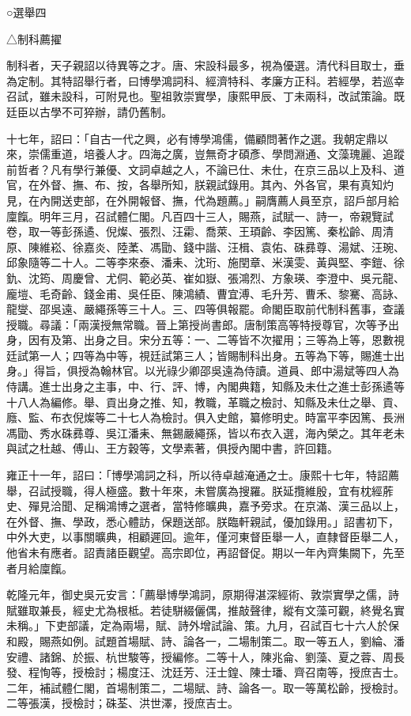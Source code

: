 
\begin{pinyinscope}
○選舉四

△制科薦擢

制科者，天子親詔以待異等之才。唐、宋設科最多，視為優選。清代科目取士，垂為定制。其特詔舉行者，曰博學鴻詞科、經濟特科、孝廉方正科。若經學，若巡幸召試，雖未設科，可附見也。聖祖敦崇實學，康熙甲辰、丁未兩科，改試策論。既廷臣以古學不可猝辦，請仍舊制。

十七年，詔曰：「自古一代之興，必有博學鴻儒，備顧問著作之選。我朝定鼎以來，崇儒重道，培養人才。四海之廣，豈無奇才碩彥、學問淵通、文藻瑰麗、追蹤前哲者？凡有學行兼優、文詞卓越之人，不論已仕、未仕，在京三品以上及科、道官，在外督、撫、布、按，各舉所知，朕親試錄用。其內、外各官，果有真知灼見，在內開送吏部，在外開報督、撫，代為題薦。」嗣膺薦人員至京，詔戶部月給廩餼。明年三月，召試體仁閣。凡百四十三人，賜燕，試賦一、詩一，帝親覽試卷，取一等彭孫遹、倪燦、張烈、汪霦、喬萊、王頊齡、李因篤、秦松齡、周清原、陳維崧、徐嘉炎、陸葇、馮勖、錢中諧、汪楫、袁佑、硃彞尊、湯斌、汪琬、邱象隨等二十人。二等李來泰、潘耒、沈珩、施閏章、米漢雯、黃與堅、李鎧、徐釚、沈筠、周慶曾、尤侗、範必英、崔如嶽、張鴻烈、方象瑛、李澄中、吳元龍、龐塏、毛奇齡、錢金甫、吳任臣、陳鴻績、曹宜溥、毛升芳、曹禾、黎騫、高詠、龍燮、邵吳遠、嚴繩孫等三十人。三、四等俱報罷。命閣臣取前代制科舊事，查議授職。尋議：「兩漢授無常職。晉上第授尚書郎。唐制策高等特授尊官，次等予出身，因有及第、出身之目。宋分五等：一、二等皆不次擢用；三等為上等，恩數視廷試第一人；四等為中等，視廷試第三人；皆賜制科出身。五等為下等，賜進士出身。」得旨，俱授為翰林官。以光祿少卿邵吳遠為侍讀。道員、郎中湯斌等四人為侍講。進士出身之主事，中、行、評、博，內閣典籍，知縣及未仕之進士彭孫遹等十八人為編修。舉、貢出身之推、知，教職，革職之檢討、知縣及未仕之舉、貢、廕、監、布衣倪燦等二十七人為檢討。俱入史館，纂修明史。時富平李因篤、長洲馮勖、秀水硃彞尊、吳江潘耒、無錫嚴繩孫，皆以布衣入選，海內榮之。其年老未與試之杜越、傅山、王方穀等，文學素著，俱授內閣中書，許回籍。

雍正十一年，詔曰：「博學鴻詞之科，所以待卓越淹通之士。康熙十七年，特詔薦舉，召試授職，得人極盛。數十年來，未嘗廣為搜羅。朕延攬維殷，宜有枕經葄史、殫見洽聞、足稱鴻博之選者，當特修曠典，嘉予旁求。在京滿、漢三品以上，在外督、撫、學政，悉心體訪，保題送部。朕臨軒親試，優加錄用。」詔書初下，中外大吏，以事關曠典，相顧遲回。逾年，僅河東督臣舉一人，直隸督臣舉二人，他省未有應者。詔責諸臣觀望。高宗即位，再詔督促。期以一年內齊集闕下，先至者月給廩餼。

乾隆元年，御史吳元安言：「薦舉博學鴻詞，原期得湛深經術、敦崇實學之儒，詩賦雖取兼長，經史尤為根柢。若徒駢綴儷偶，推敲聲律，縱有文藻可觀，終覺名實未稱。」下吏部議，定為兩場，賦、詩外增試論、策。九月，召試百七十六人於保和殿，賜燕如例。試題首場賦、詩、論各一，二場制策二。取一等五人，劉綸、潘安禮、諸錦、於振、杭世駿等，授編修。二等十人，陳兆侖、劉藻、夏之蓉、周長發、程恂等，授檢討；楊度汪、沈廷芳、汪士鍠、陳士璠、齊召南等，授庶吉士。二年，補試體仁閣，首場制策二，二場賦、詩、論各一。取一等萬松齡，授檢討。二等張漢，授檢討；硃荃、洪世澤，授庶吉士。


\end{pinyinscope}
